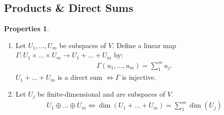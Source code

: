 \documentclass{article}
\theoremstyle{definition}
\newtheorem{prop}{Properties}[section]
\begin{document}
\subsection{Products \& Direct Sums}
\begin{prop}
	$\,$
	\begin{enumerate}
	\item Let $U_1,\dots,U_m$ be subspaces of $V$. Define a linear map $\Gamma : U_1\times\dots\times U_m \rightarrow U_1 + \dots + U_m$ by:
	\begin{align*}
	\Gamma(u_1,\dots,u_m) = \sum_1^m u_j.
	\end{align*}
	$U_1 + \dots + U_m$ is a direct sum $\iff \Gamma$ is injective. 
	\item Let $U_j$ be finite-dimensional and are subspaces of $V$. 
	\begin{align*}
	U_1 \oplus \dots\oplus U_m \iff \dim(U_1+\dots+U_m) = \sum_1^m\dim(U_j)
	\end{align*}
	\end{enumerate}
\end{prop}
\end{document}
